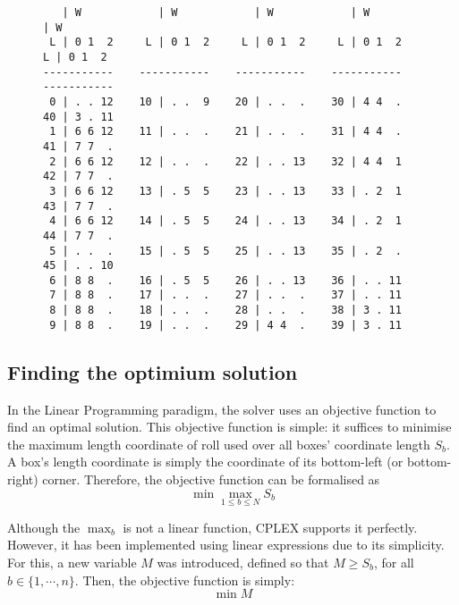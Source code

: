 \begin{figure}[H]
\centering
{\scriptsize
\begin{BVerbatim}
   | W            | W            | W            | W            | W    
 L | 0 1  2     L | 0 1  2     L | 0 1  2     L | 0 1  2     L | 0 1  2    
-----------    -----------    -----------    -----------    -----------
 0 | . . 12    10 | . .  9    20 | . .  .    30 | 4 4  .    40 | 3 . 11 
 1 | 6 6 12    11 | . .  .    21 | . .  .    31 | 4 4  .    41 | 7 7  . 
 2 | 6 6 12    12 | . .  .    22 | . . 13    32 | 4 4  1    42 | 7 7  . 
 3 | 6 6 12    13 | . 5  5    23 | . . 13    33 | . 2  1    43 | 7 7  . 
 4 | 6 6 12    14 | . 5  5    24 | . . 13    34 | . 2  1    44 | 7 7  . 
 5 | . .  .    15 | . 5  5    25 | . . 13    35 | . 2  .    45 | . . 10
 6 | 8 8  .    16 | . 5  5    26 | . . 13    36 | . . 11 
 7 | 8 8  .    17 | . .  .    27 | . .  .    37 | . . 11 
 8 | 8 8  .    18 | . .  .    28 | . .  .    38 | 3 . 11 
 9 | 8 8  .    19 | . .  .    29 | 4 4  .    39 | 3 . 11 
\end{BVerbatim}
}
\label{fig:valid-roll}
\end{figure}

\subsection{Finding the optimium solution}
\label{sec:linear-programming:optimum}

In the Linear Programming paradigm, the solver uses an objective function to find an optimal
solution. This objective function is simple: it suffices to minimise the maximum length
coordinate of roll used over all boxes' coordinate length $S_b$. A box's length coordinate
is simply the  coordinate of its bottom-left (or bottom-right) corner. Therefore, the
objective function can be formalised as
\begin{equation}
\label{eq:linear-programming:objective-func}
\min \max_{1 \le b \le N} S_b
\end{equation}

Although the $\max_b$ is not a linear function, CPLEX supports it perfectly. However, it has
been implemented using linear expressions due to its simplicity. For this, a new variable $M$
was introduced, defined so that $M \ge S_b$, for all $b \in \{1,\cdots,n\}$. Then, the objective
function is simply:
\[
\min M
\]

